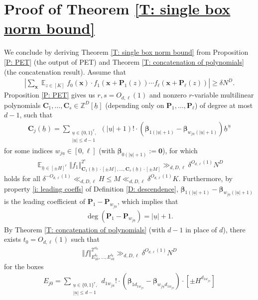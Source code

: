 \documentclass[11pt]{amsart}
\theoremstyle{definition}
\DeclareMathOperator*{\E}{\mathbb{E}}
\newcommand{\Z}{{\mathbb Z}}
\newcommand{\bc}{{\mathbf{C}}}
\newcommand{\bp}{{\mathbf{P}}}
\newcommand{\p}{{\mathbf{P}}}
\newcommand{\bx}{{\mathbf{x}}}
\newcommand{\bbeta}{{\boldsymbol{\beta}}}
\newcommand{\uh}{{\underline{h}}}
\newcommand{\uu}{{\underline{u}}}
\newcommand{\norm}[1]{\left\Vert #1\right\Vert}
\newcommand{\abs}[1]{\mathopen{}\left| #1\mathclose{}\right|}
\begin{document}
\section{Proof of Theorem \ref{T: single box norm bound}}\label{S: proof of main thm}

We conclude by deriving Theorem \ref{T: single box norm bound} from Proposition \ref{P: PET} (the output of PET) and Theorem \ref{T: concatenation of polynomials} (the concatenation result).
    Assume that 
    \begin{align*}
            \abs{\sum_{\bx}\E_{z\in[K]} f_0(\bx)\cdot f_1(\bx+\p_1(z))\cdots f_\ell(\bx+\p_\ell(z))} \geq \delta N^D.
    \end{align*}
    Proposition \ref{P: PET} gives us $r, s=O_{d,\ell}(1)$ and nonzero $r$-variable multilinear polynomials $\bc_1, \ldots, \bc_s\in\Z^D[\uh]$ (depending only on $\bp_1, \ldots, \bp_\ell$) of degree at most $d-1$, such that 
    \begin{align*}
        \bc_{j}(\uh) = \sum_{\substack{\uu\in \{0,1\}^{r},\\ |\uu|\leq d-1}}     (|\uu|+1)! \cdot (\bbeta_{1(|\uu|+1)}-\bbeta_{w_{j\uu}(|\uu|+1)})\uh^\uu
    \end{align*}
                for some indices $w_{j\uu}\in[0,\ell]$ (with $\bbeta_{0(|\uu|+1)}:=\mathbf{0}$), for which
      \begin{align*}
       \E_{\uh\in[\pm H]^{r}}\norm{f_1}_{{\bc_1(\uh)}\cdot[\pm M], \ldots, {\bc_s(\uh)\cdot[\pm M]}}^{2^s} \gg_{d, D, \ell} \delta^{O_{d,\ell}(1)}N^D
   \end{align*}
   holds for all $\delta^{-O_{d,\ell}(1)}\ll_{d, D, \ell} H\leq  M\ll_{d, D, \ell}\delta^{O_{d, \ell}(1)}K$.
   Furthermore, by property \eqref{i: leading coeffs} of Definition \ref{D: descendence}, $\bbeta_{1(|\uu|+1)}-\bbeta_{w_{j\uu}(|\uu|+1)}$ is the leading coefficient of $\p_1 - \p_{w_{j\uu}}$, which implies that
  \begin{align*}%
      \deg (\bp_1 - \bp_{w_{j\uu}}) = |\uu|+1.
  \end{align*}
  By Theorem \ref{T: concatenation of polynomials} (with $d-1$ in place of $d$), there exists $t_0=O_{d,\ell}(1)$ such that %
    \begin{align*}
        \norm{f}_{E_{10}^{ t_0}, \ldots, E_{s0}^{ t_0}}^{2^{st_0}}\gg_{d, D, \ell}\delta^{O_{d, \ell}(1)}N^D
    \end{align*}
    for the boxes 
    \begin{align*}
        E_{j0} = \sum_{\substack{\uu\in \{0,1\}^{r},\\ |\uu|\leq d-1}}     d_{1w_{j\uu}}! \cdot (\bbeta_{1d_{1w_{j\uu}}}-\bbeta_{w_{j\uu}d_{1w_{j\uu}}})\cdot [\pm H^{d_{1w_{j\uu}}}]
    \end{align*}    
\end{document}
